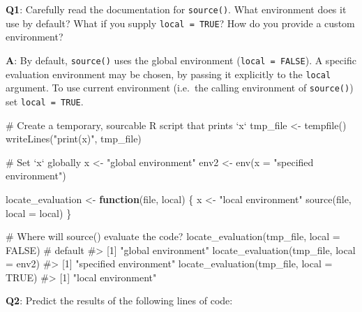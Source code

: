 \documentclass[
]{krantz}
\makeatletter
\newenvironment{Shaded}{\begin{snugshade}}{\end{snugshade}}
\newcommand{\CommentTok}[1]{\textcolor[rgb]{0.56,0.35,0.01}{\textit{#1}}}
\newcommand{\ControlFlowTok}[1]{\textcolor[rgb]{0.13,0.29,0.53}{\textbf{#1}}}
\newcommand{\DataTypeTok}[1]{\textcolor[rgb]{0.13,0.29,0.53}{#1}}
\newcommand{\KeywordTok}[1]{\textcolor[rgb]{0.13,0.29,0.53}{\textbf{#1}}}
\newcommand{\NormalTok}[1]{#1}
\newcommand{\OtherTok}[1]{\textcolor[rgb]{0.56,0.35,0.01}{#1}}
\newcommand{\StringTok}[1]{\textcolor[rgb]{0.31,0.60,0.02}{#1}}
\newenvironment{kframe}{%
\medskip{}
\setlength{\fboxsep}{.8em}
 \def\at@end@of@kframe{}%
 \ifinner\ifhmode%
  \def\at@end@of@kframe{\end{minipage}}%
  \begin{minipage}{\columnwidth}%
 \fi\fi%
 \def\FrameCommand##1{\hskip\@totalleftmargin \hskip-\fboxsep
 \colorbox{shadecolor}{##1}\hskip-\fboxsep
     \hskip-\linewidth \hskip-\@totalleftmargin \hskip\columnwidth}%
 \MakeFramed {\advance\hsize-\width
   \@totalleftmargin\z@ \linewidth\hsize
   \@setminipage}}%
 {\par\unskip\endMakeFramed%
 \at@end@of@kframe}
\renewenvironment{Shaded}{\begin{kframe}}{\end{kframe}}
\renewcommand{\KeywordTok} [1]{\textcolor[rgb]{0.00,0.44,0.13}{{#1}}}
\renewcommand{\DataTypeTok}[1]{\textcolor[rgb]{0.56,0.13,0.00}{{#1}}}
\renewcommand{\StringTok}  [1]{\textcolor[rgb]{0.25,0.44,0.63}{{#1}}}
\renewcommand{\CommentTok} [1]{\textcolor[rgb]{0.38,0.63,0.69}{{#1}}}
\renewcommand{\OtherTok}   [1]{\textcolor[rgb]{0.00,0.44,0.13}{{#1}}}
\renewcommand{\NormalTok}  [1]{{#1}}
\makeatother
\begin{document}
\textbf{{Q1}}: Carefully read the documentation for \texttt{source()}. What environment does it use by default? What if you supply \texttt{local\ =\ TRUE}? How do you provide a custom environment?

\textbf{{A}}: By default, \texttt{source()} uses the global environment (\texttt{local\ =\ FALSE}). A specific evaluation environment may be chosen, by passing it explicitly to the \texttt{local} argument. To use current environment (i.e.~the calling environment of \texttt{source()}) set \texttt{local\ =\ TRUE}.

\begin{Shaded}
\begin{Highlighting}[]
\CommentTok{# Create a temporary, sourcable R script that prints `x`}
\NormalTok{tmp_file <-}\StringTok{ }\KeywordTok{tempfile}\NormalTok{()}
\KeywordTok{writeLines}\NormalTok{(}\StringTok{"print(x)"}\NormalTok{, tmp_file)}

\CommentTok{# Set `x` globally}
\NormalTok{x <-}\StringTok{ "global environment"}
\NormalTok{env2 <-}\StringTok{ }\KeywordTok{env}\NormalTok{(}\DataTypeTok{x =} \StringTok{"specified environment"}\NormalTok{)}

\NormalTok{locate_evaluation <-}\StringTok{ }\ControlFlowTok{function}\NormalTok{(file, local) \{}
\NormalTok{  x <-}\StringTok{ "local environment"}
  \KeywordTok{source}\NormalTok{(file, }\DataTypeTok{local =}\NormalTok{ local)}
\NormalTok{\}}

\CommentTok{# Where will source() evaluate the code?}
\KeywordTok{locate_evaluation}\NormalTok{(tmp_file, }\DataTypeTok{local =} \OtherTok{FALSE}\NormalTok{)  }\CommentTok{# default}
\CommentTok{#> [1] "global environment"}
\KeywordTok{locate_evaluation}\NormalTok{(tmp_file, }\DataTypeTok{local =}\NormalTok{ env2)}
\CommentTok{#> [1] "specified environment"}
\KeywordTok{locate_evaluation}\NormalTok{(tmp_file, }\DataTypeTok{local =} \OtherTok{TRUE}\NormalTok{)}
\CommentTok{#> [1] "local environment"}
\end{Highlighting}
\end{Shaded}

\textbf{{Q2}}: Predict the results of the following lines of code:
\end{document}
